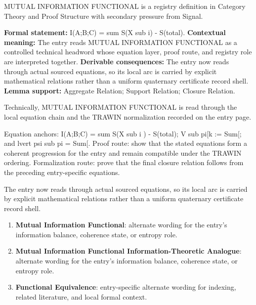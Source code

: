 
\begingroup\small
{}
MUTUAL INFORMATION FUNCTIONAL is a registry definition in Category Theory and Proof Structure with secondary pressure from Signal.

\begingroup\footnotesize\setlength{\emergencystretch}{3em}\sloppy
\textbf{Formal statement:} I(A;B;C) = sum S(X sub i) - S(total). \textbf{Contextual meaning:} The entry reads MUTUAL INFORMATION FUNCTIONAL as a controlled technical headword whose equation layer, proof route, and registry role are interpreted together. \textbf{Derivable consequences:} The entry now reads through actual sourced equations, so its local arc is carried by explicit mathematical relations rather than a uniform quaternary certificate record shell. \textbf{Lemma support:} Aggregate Relation; Support Relation; Closure Relation.\par
\endgroup

Technically, MUTUAL INFORMATION FUNCTIONAL is read through the local equation chain and the TRAWIN normalization recorded on the entry page.

Equation anchors: I(A;B;C) = sum S(X sub i ) - S(total); V sub pi[k := Sum[; and lvert psi sub pi = Sum[. Proof route: show that the stated equations form a coherent progression for the entry and remain compatible under the TRAWIN ordering. Formalization route: prove that the final closure relation follows from the preceding entry-specific equations.

The entry now reads through actual sourced equations, so its local arc is carried by explicit mathematical relations rather than a uniform quaternary certificate record shell.
\endgroup

\begin{enumerate}[leftmargin=1.6em,itemsep=6pt,topsep=4pt]
\item \textbf{Mutual Information Functional}: alternate wording for the entry's information balance, coherence state, or entropy role.
\item \textbf{Mutual Information Functional Information-Theoretic Analogue}: alternate wording for the entry's information balance, coherence state, or entropy role.
\item \textbf{Functional Equivalence}: entry-specific alternate wording for indexing, related literature, and local formal context.
\end{enumerate}

